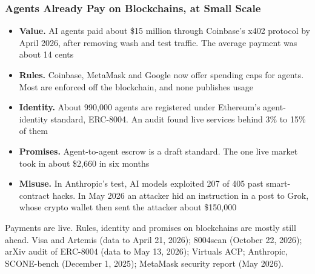 \documentclass[aspectratio=169]{beamer}
\newcommand{\bi}{\begin{itemize}}
\newcommand{\ei}{\end{itemize}}
\newcommand{\m}{\item}
\begin{document}
\begin{frame}[label=appx-agentsnow]
\frametitle{Agents Already Pay on Blockchains, at Small Scale}

\footnotesize
\bi
\m \textbf{Value.} AI agents paid about \$15 million through Coinbase's x402 protocol by April 2026, after removing wash and test traffic. The average payment was about 14 cents
\m \textbf{Rules.} Coinbase, MetaMask and Google now offer spending caps for agents. Most are enforced off the blockchain, and none publishes usage
\m \textbf{Identity.} About 990,000 agents are registered under Ethereum's agent-identity standard, ERC-8004. An audit found live services behind 3\% to 15\% of them
\m \textbf{Promises.} Agent-to-agent escrow is a draft standard. The one live market took in about \$2,660 in six months
\m \textbf{Misuse.} In Anthropic's test, AI models exploited 207 of 405 past smart-contract hacks. In May 2026 an attacker hid an instruction in a post to Grok, whose crypto wallet then sent the attacker about \$150,000
\ei
\vspace{1mm}
{\small Payments are live. Rules, identity and promises on blockchains are mostly still ahead.}
\vfill
{\scriptsize Visa and Artemis (data to April 21, 2026); 8004scan (October 22, 2026); arXiv audit of ERC-8004 (data to May 13, 2026); Virtuals ACP; Anthropic, SCONE-bench (December 1, 2025); MetaMask security report (May 2026).}
\par\vspace{0pt plus 1fill}\hfill{\scriptsize \hyperlink{main-thesis}{}}
\end{frame}
\end{document}
